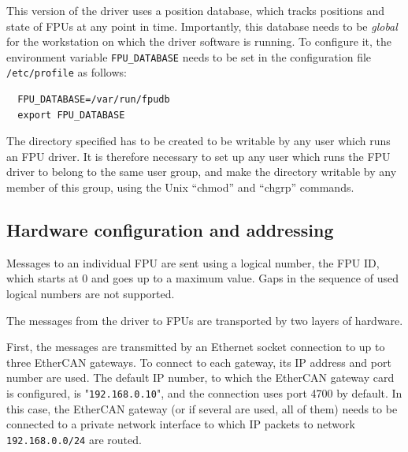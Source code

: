 \documentclass[11pt,a4paper]{scrartcl}
\begin{document}
This version of the driver uses a position database, which tracks
positions and state of FPUs at any point in time. Importantly, this
database needs to be \emph{global} for the workstation on which the
driver software is running. To configure it, the environment variable
\texttt{FPU\_DATABASE} needs to be set in the configuration file
\texttt{/etc/profile} as follows:

%
\begin{verbatim}
  FPU_DATABASE=/var/run/fpudb
  export FPU_DATABASE
\end{verbatim}

The directory specified has to be created to be writable by any user
which runs an FPU driver. It is therefore necessary to set up any user
which runs the FPU driver to belong to the same user group, and make
the directory writable by any member of this group, using the Unix
``chmod'' and ``chgrp'' commands.

\subsection{Hardware configuration and addressing}
Messages to an individual FPU are sent using a logical number, the FPU
ID, which starts at 0 and goes up to a maximum value. Gaps in the
sequence of used logical numbers are not supported.

The messages from the driver to FPUs are transported by two layers of
hardware.

   First, the
messages are transmitted by an Ethernet socket connection to up to
three EtherCAN gateways. To connect to each gateway, its IP address
and port number are used. The default IP number, to which the EtherCAN
gateway card is configured, is "\texttt{192.168.0.10}", and the
connection uses port 4700 by default. In this case, the EtherCAN
gateway (or if several are used, all of them) needs to be connected to
a private network interface to which IP packets to network
\texttt{192.168.0.0/24} are routed.
\end{document}

